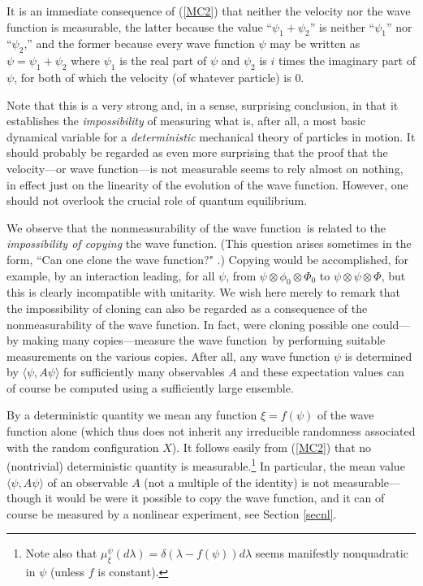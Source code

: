 \documentclass[12pt]{article}
\newcommand{\eq}[1]{(\ref{#1})}
\newcommand{\wf}{wave function}
\begin{document}
It is an immediate consequence of \eq{MC2} that neither the velocity
nor the wave function is measurable, the latter because the value ``$
\psi_1+ \psi_2$'' is neither ``$\psi_1$'' nor ``$\psi_2$,'' and the
former because every wave function $\psi$ may be written as
$\psi=\psi_1+ \psi_2$ where $\psi_1$ is the real part of $\psi$ and
$\psi_2$ is $i$ times the imaginary part of $\psi$, for both of which
the velocity (of whatever particle) is 0.

Note that this is a very strong and, in a sense, surprising
conclusion, in that it establishes the {\it impossibility} of
measuring what is, after all, a most basic dynamical variable for a
{\it deterministic} mechanical theory of particles in motion. It
should probably be regarded as even more surprising that the proof
that the velocity---or wave function---is not measurable seems to rely
almost on nothing, in effect just on the linearity of the evolution of
the \wf. However, one should not overlook the crucial role of quantum
equilibrium.

We observe that the nonmeasurability of the \wf\ is related to the
{\it impossibility of copying} the \wf. (This question arises
sometimes in the form, ``Can one clone the wave function?"
\cite{ghiraun, WoZu, ghira}.) Copying would be accomplished, for
example, by an interaction leading, for all $\psi$, {}from
$\psi\otimes\phi_0\otimes\Phi_0$ to $\psi\otimes\psi\otimes\Phi$, but
this is clearly incompatible with unitarity. We wish here merely to
remark that the impossibility of cloning can also be regarded as a
consequence of the nonmeasurability of the \wf. In fact, were cloning
possible one could---by making many copies---measure the \wf\ by
performing suitable measurements on the various copies. After all, any
wave function $\psi$ is determined by $\langle \psi, A \psi\rangle$
for sufficiently many observables $A$ and these expectation values can
of course be computed using a sufficiently large ensemble.

By a deterministic quantity we mean any function ${\xi}=f(\psi)$ of
the wave function alone (which thus does not inherit any irreducible
randomness associated with the random configuration $X$).  It follows
easily {}from \eq{MC2} that no (nontrivial) deterministic quantity is
measurable.\footnote{Note also that
   $\mu_{\xi}^\psi(d\lambda)=\delta(\lambda-f(\psi)) d\lambda$ seems
   manifestly nonquadratic in $\psi$ (unless $f$ is constant).} In
particular, the mean value $\langle \psi, A \psi\rangle$ of an
observable $A$ (not a multiple of the identity) is not
measurable---though it would be were it possible to copy the wave
function, and it can of course be measured by a nonlinear experiment,
see Section \ref{secnl}.
\end{document}
